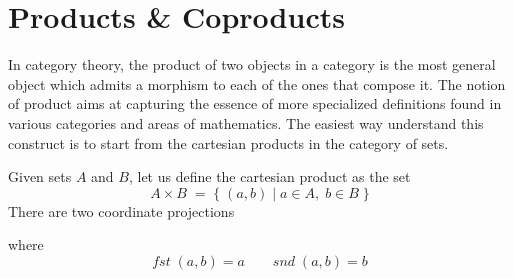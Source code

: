 \begin{center}
\begin{minipage}{.3\textwidth}
\end{minipage}
\begin{minipage}{.3\textwidth}
\end{minipage}
\end{center}

\section{Products \& Coproducts}

In category theory, the product of two objects in a category is the most general object which admits a morphism to each of the ones that compose it. The notion of product aims at capturing the essence of more specialized definitions found in various categories and areas of mathematics. The easiest way understand this construct is to start from the cartesian products in the category of sets.

Given sets $A$ and $B$, let us define the cartesian product as the set $$A \times B\; =\; \{\; (a, b)\; |\; a \in A,\; b \in B\; \} $$ There are two coordinate projections
\begin{center}
\end{center}
where $$ fst\; (a, b) = a \qquad snd\; (a, b) = b $$ 


